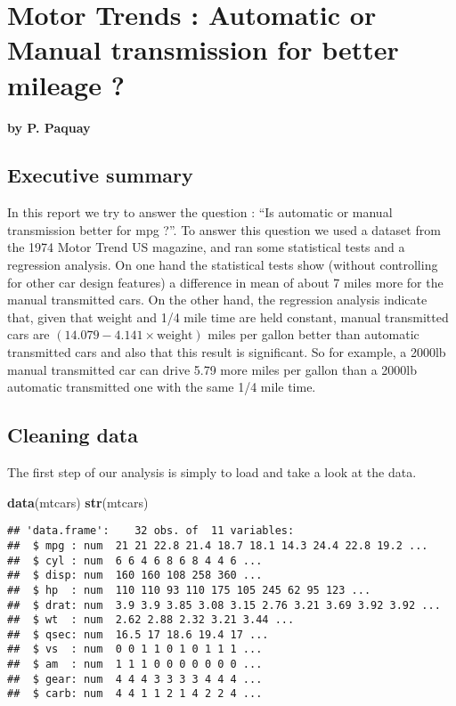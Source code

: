 \documentclass[a3paper]{article}
\author{}
\date{}
\newenvironment{Shaded}{\begin{snugshade}}{\end{snugshade}}
\newcommand{\KeywordTok}[1]{\textcolor[rgb]{0.13,0.29,0.53}{\textbf{{#1}}}}
\newcommand{\NormalTok}[1]{{#1}}
\begin{document}
\begin{center}
\normalsize
\end{center}


\section{Motor Trends : Automatic or Manual transmission for better
mileage
?}\label{motor-trends-automatic-or-manual-transmission-for-better-mileage}

\textbf{by P. Paquay}

\subsection{Executive summary}\label{executive-summary}

In this report we try to answer the question : ``Is automatic or manual
transmission better for mpg ?''. To answer this question we used a
dataset from the 1974 Motor Trend US magazine, and ran some statistical
tests and a regression analysis. On one hand the statistical tests show
(without controlling for other car design features) a difference in mean
of about 7 miles more for the manual transmitted cars. On the other
hand, the regression analysis indicate that, given that weight and 1/4
mile time are held constant, manual transmitted cars are
$(14.079 - 4.141 \times \mathrm{weight})$ miles per gallon better than
automatic transmitted cars and also that this result is significant. So
for example, a 2000lb manual transmitted car can drive 5.79 more miles
per gallon than a 2000lb automatic transmitted one with the same 1/4
mile time.

\subsection{Cleaning data}\label{cleaning-data}

The first step of our analysis is simply to load and take a look at the
data.

\begin{Shaded}
\begin{Highlighting}[]
\KeywordTok{data}\NormalTok{(mtcars)}
\KeywordTok{str}\NormalTok{(mtcars)}
\end{Highlighting}
\end{Shaded}

\begin{verbatim}
## 'data.frame':    32 obs. of  11 variables:
##  $ mpg : num  21 21 22.8 21.4 18.7 18.1 14.3 24.4 22.8 19.2 ...
##  $ cyl : num  6 6 4 6 8 6 8 4 4 6 ...
##  $ disp: num  160 160 108 258 360 ...
##  $ hp  : num  110 110 93 110 175 105 245 62 95 123 ...
##  $ drat: num  3.9 3.9 3.85 3.08 3.15 2.76 3.21 3.69 3.92 3.92 ...
##  $ wt  : num  2.62 2.88 2.32 3.21 3.44 ...
##  $ qsec: num  16.5 17 18.6 19.4 17 ...
##  $ vs  : num  0 0 1 1 0 1 0 1 1 1 ...
##  $ am  : num  1 1 1 0 0 0 0 0 0 0 ...
##  $ gear: num  4 4 4 3 3 3 3 4 4 4 ...
##  $ carb: num  4 4 1 1 2 1 4 2 2 4 ...
\end{verbatim}
\end{document}
